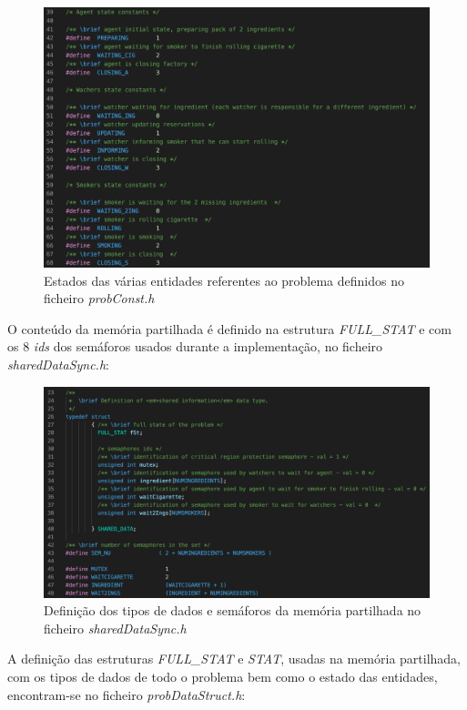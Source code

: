 \documentclass[10pt,portuguese]{article}
\begin{document}
\begin{figure}[!h]
    \centering
    \includegraphics[width=\textwidth]{images/Problem/estados.png}
    \caption{Estados das várias entidades referentes ao problema definidos no ficheiro \textit{probConst.h}}
\end{figure}
\clearpage
\par O conteúdo da memória partilhada é definido na estrutura \textit{FULL\_STAT} e com os 8 \textit{ids} dos semáforos usados durante a implementação, no ficheiro \textit{sharedDataSync.h}:
\begin{figure}[!h]
    \centering
    \includegraphics[width=\textwidth]{images/Problem/sharedmem.png}
    \caption{Definição dos tipos de dados e semáforos da memória partilhada no ficheiro \textit{sharedDataSync.h}}
\end{figure}
\clearpage
\par A definição das estruturas \textit{FULL\_STAT} e \textit{STAT}, usadas na memória partilhada, com os tipos de dados de todo o problema bem como o estado das entidades, encontram-se no ficheiro \textit{probDataStruct.h}:
\end{document}
